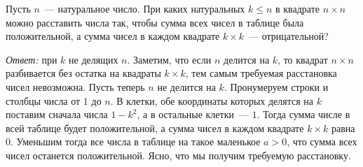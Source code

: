 \problem
Пусть $n$~--- натуральное число.
При каких натуральных $k \leq n$ в квадрате $n \times n$ можно расставить числа
так, чтобы сумма всех чисел в таблице была положительной, а сумма чисел в каждом
квадрате $k \times k$~--- отрицательной?

\solution
\emph{Ответ:} при $k$ не делящих $n$.
Заметим, что если $n$ делится на $k$, то квадрат $n \times n$ разбивается без
остатка на квадраты $k \times k$, тем самым требуемая расстановка чисел
невозможна.
Пусть теперь $n$ не делится на $k$.
Пронумеруем строки и столбцы числа от $1$ до $n$.
В клетки, обе координаты которых делятся на $k$ поставим сначала числа
$1 - k^2$, а в остальные клетки~--- $1$.
Тогда сумма числе в всей таблице будет положительной, а сумма чисел в каждом
квадрате $k \times k$ равна $0$.
Уменьшим тогда все числа в таблице на такое маленькое $a > 0$, что сумма всех
чисел останется положительной.
Ясно, что мы получим требуемую расстановку.

\endproblem
